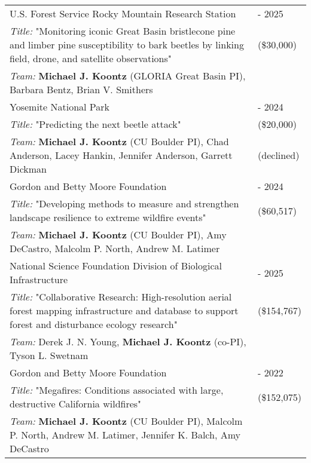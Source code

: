 \begin{longtable}{@{}>{\raggedright}p{5.25in} @{} >{\raggedleft}X@{}}

U.S. Forest Service Rocky Mountain Research Station & 2023 - 2025 \tabularnewline
\addtolength{\leftskip}{5ex}\emph{Title:} "Monitoring iconic Great Basin bristlecone pine and limber pine susceptibility to bark beetles by linking field, drone, and satellite observations" & (\$30,000) \tabularnewline
\addtolength{\leftskip}{5ex}\emph{Team:} \textbf{Michael J. Koontz} (GLORIA Great Basin PI), Barbara Bentz, Brian V. Smithers & \tabularnewline

Yosemite National Park & 2023 - 2024 \tabularnewline
\addtolength{\leftskip}{5ex}\emph{Title:} "Predicting the next beetle attack" & (\$20,000) \tabularnewline
\addtolength{\leftskip}{5ex}\emph{Team:} \textbf{Michael J. Koontz} (CU Boulder PI), Chad Anderson, Lacey Hankin, Jennifer Anderson, Garrett Dickman & (declined) \tabularnewline

Gordon and Betty Moore Foundation & 2023 - 2024 \tabularnewline
\addtolength{\leftskip}{5ex}\emph{Title:} "Developing methods to measure and strengthen landscape resilience to extreme wildfire events" & (\$60,517) \tabularnewline
\addtolength{\leftskip}{5ex}\emph{Team:} \textbf{Michael J. Koontz} (CU Boulder PI), Amy DeCastro, Malcolm P. North, Andrew M. Latimer & \tabularnewline


National Science Foundation Division of Biological Infrastructure & 2022 - 2025 \tabularnewline
\addtolength{\leftskip}{5ex}\emph{Title:} "Collaborative Research: High-resolution aerial forest mapping infrastructure and database to support forest and disturbance ecology research" & (\$154,767) \tabularnewline
\addtolength{\leftskip}{5ex}\emph{Team:} Derek J. N. Young, \textbf{Michael J. Koontz} (co-PI), Tyson L. Swetnam & \tabularnewline

Gordon and Betty Moore Foundation & 2020 - 2022 \tabularnewline
\addtolength{\leftskip}{5ex}\emph{Title:} "Megafires: Conditions associated with large, destructive California wildfires" & (\$152,075) \tabularnewline
\addtolength{\leftskip}{5ex}\emph{Team:} \textbf{Michael J. Koontz} (CU Boulder PI), Malcolm P. North, Andrew M. Latimer, Jennifer K. Balch, Amy DeCastro & \tabularnewline


\end{longtable}
